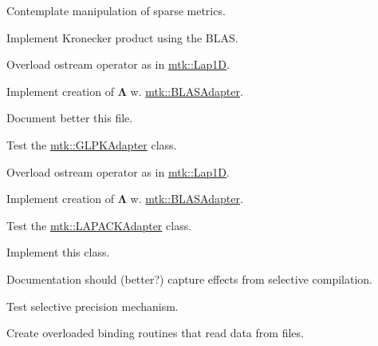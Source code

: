 \begin{DoxyRefList}
Contemplate manipulation of sparse metrics.

Implement Kronecker product using the B\-L\-A\-S. 
\item[\label{todo__todo000012}%
\hypertarget{todo__todo000012}{}%
File \hyperlink{mtk__div__1d_8cc}{mtk\-\_\-div\-\_\-1d.cc} ]Overload ostream operator as in \hyperlink{classmtk_1_1Lap1D}{mtk\-::\-Lap1\-D}.

Implement creation of $ \mathbf{\Lambda}$ w. \hyperlink{classmtk_1_1BLASAdapter}{mtk\-::\-B\-L\-A\-S\-Adapter}.  
\item[\label{todo__todo000014}%
\hypertarget{todo__todo000014}{}%
File \hyperlink{mtk__glpk__adapter_8cc}{mtk\-\_\-glpk\-\_\-adapter.cc} ]Document better this file.  
\item[\label{todo__todo000021}%
\hypertarget{todo__todo000021}{}%
File \hyperlink{mtk__glpk__adapter__test_8cc}{mtk\-\_\-glpk\-\_\-adapter\-\_\-test.cc} ]Test the \hyperlink{classmtk_1_1GLPKAdapter}{mtk\-::\-G\-L\-P\-K\-Adapter} class.  
\item[\label{todo__todo000015}%
\hypertarget{todo__todo000015}{}%
File \hyperlink{mtk__grad__1d_8cc}{mtk\-\_\-grad\-\_\-1d.cc} ]Overload ostream operator as in \hyperlink{classmtk_1_1Lap1D}{mtk\-::\-Lap1\-D}.

Implement creation of $ \mathbf{\Lambda}$ w. \hyperlink{classmtk_1_1BLASAdapter}{mtk\-::\-B\-L\-A\-S\-Adapter}.  
\item[\label{todo__todo000022}%
\hypertarget{todo__todo000022}{}%
File \hyperlink{mtk__lapack__adapter__test_8cc}{mtk\-\_\-lapack\-\_\-adapter\-\_\-test.cc} ]Test the \hyperlink{classmtk_1_1LAPACKAdapter}{mtk\-::\-L\-A\-P\-A\-C\-K\-Adapter} class.  
\item[\label{todo__todo000005}%
\hypertarget{todo__todo000005}{}%
File \hyperlink{mtk__quad__1d_8h}{mtk\-\_\-quad\-\_\-1d.h} ]Implement this class.  
\item[\label{todo__todo000006}%
\hypertarget{todo__todo000006}{}%
File \hyperlink{mtk__roots_8h}{mtk\-\_\-roots.h} ]Documentation should (better?) capture effects from selective compilation.

Test selective precision mechanism.  
\item[\label{todo__todo000008}%
\hypertarget{todo__todo000008}{}%
File \hyperlink{mtk__uni__stg__grid__1d_8h}{mtk\-\_\-uni\-\_\-stg\-\_\-grid\-\_\-1d.h} ]Create overloaded binding routines that read data from files. 
\end{DoxyRefList}